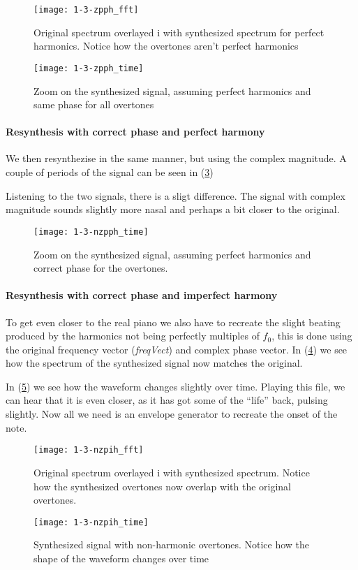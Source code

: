 \begin{figure}
	\center
	\texttt{[image: 1-3-zpph\_fft]}
	\caption{ Original spectrum overlayed i with synthesized
spectrum for perfect harmonics. Notice how the overtones aren't perfect
harmonics }
	\label{fig:1-3-zpph_fft}
\end{figure}

\begin{figure}
	\center
	\texttt{[image: 1-3-zpph\_time]}
	\caption{ Zoom on the synthesized signal, assuming perfect
harmonics and same phase for all overtones }
	\label{fig:1-3-zpph_time}
\end{figure}


\paragraph{ Resynthesis with correct phase and perfect harmony }
We then resynthezise in the same manner, but using the complex magnitude.
A couple of periods of the signal can be seen in
(\ref{fig:1-3-nzpph_time})

Listening to the two signals, there is a sligt difference.
The signal with complex magnitude sounds slightly more nasal and perhaps a bit
closer to the original.

\begin{figure}
	\center
	\texttt{[image: 1-3-nzpph\_time]}
	\caption{ Zoom on the synthesized signal, assuming
 perfect harmonics and correct phase for the overtones. }
	\label{fig:1-3-nzpph_time}
\end{figure}

\paragraph{ Resynthesis with correct phase and imperfect harmony }
To get even closer to the real piano we also have to recreate the slight beating
produced by the harmonics not being perfectly multiples of $f_0$,
this is done using the original frequency vector (\emph{freqVect}) and complex
phase vector. In (\ref{fig:1-3-nzpih_fft}) we see how the spectrum of the
synthesized signal now matches the original.

In (\ref{fig:1-3-nzpih_time}) we see how the waveform changes slightly over
time.
Playing this file, we can hear that it is even closer, as it has got some of the
``life'' back, pulsing slightly. Now all we need is an envelope generator to
recreate the onset of the note.

\begin{figure}
	\center
	\texttt{[image: 1-3-nzpih\_fft]}
	\caption{ Original spectrum overlayed i with synthesized
spectrum. Notice how the synthesized overtones now overlap with the original
overtones. }
	\label{fig:1-3-nzpih_fft}
\end{figure}

\begin{figure}
	\center
	\texttt{[image: 1-3-nzpih\_time]}
	\caption{ Synthesized signal with
non-harmonic overtones. Notice how the shape of the
waveform changes over time }
	\label{fig:1-3-nzpih_time}
\end{figure}
